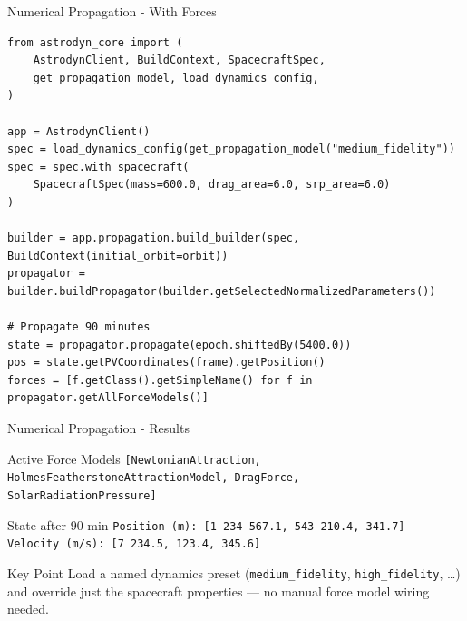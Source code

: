\documentclass[aspectratio=169,12pt]{beamer}
\begin{document}
\begin{frame}[fragile]{Numerical Propagation - With Forces}
    \begin{verbatim}
from astrodyn_core import (
    AstrodynClient, BuildContext, SpacecraftSpec,
    get_propagation_model, load_dynamics_config,
)

app = AstrodynClient()
spec = load_dynamics_config(get_propagation_model("medium_fidelity"))
spec = spec.with_spacecraft(
    SpacecraftSpec(mass=600.0, drag_area=6.0, srp_area=6.0)
)

builder = app.propagation.build_builder(spec, BuildContext(initial_orbit=orbit))
propagator = builder.buildPropagator(builder.getSelectedNormalizedParameters())

# Propagate 90 minutes
state = propagator.propagate(epoch.shiftedBy(5400.0))
pos = state.getPVCoordinates(frame).getPosition()
forces = [f.getClass().getSimpleName() for f in propagator.getAllForceModels()]
    \end{verbatim}
\end{frame}

\begin{frame}{Numerical Propagation - Results}
    \begin{alertblock}{Active Force Models}
        \texttt{[NewtonianAttraction, HolmesFeatherstoneAttractionModel, DragForce,\\
        SolarRadiationPressure]}
    \end{alertblock}
    \vspace{0.4cm}
    \begin{exampleblock}{State after 90 min}
        \texttt{Position (m): [1\,234\,567.1,\,543\,210.4,\,341.7]}\\
        \texttt{Velocity (m/s): [7\,234.5,\,123.4,\,345.6]}
    \end{exampleblock}
    \vspace{0.4cm}
    \begin{block}{Key Point}
        Load a named dynamics preset (\texttt{medium\_fidelity}, \texttt{high\_fidelity}, \ldots)
        and override just the spacecraft properties --- no manual force model wiring needed.
    \end{block}
\end{frame}
\end{document}
